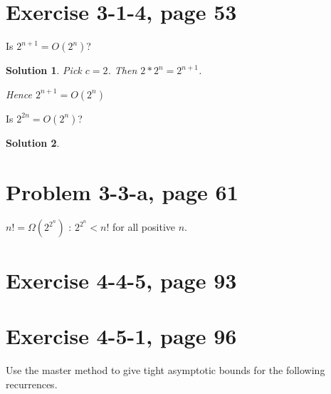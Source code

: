 \documentclass[letterpaper, 11pt]{article}
\theoremstyle{mystyle}
\newtheorem*{sln}{Solution}
\begin{document}
\section{Exercise 3-1-4, page 53}
Is $2^{n+1} = O(2^n)$? 

\begin{sln}
    Pick $c=2$. Then $2 * 2^n = 2^{n+1}$. 

    Hence $2^{n+1} = O(2^n)$
\end{sln}

Is $2^{2n} = O(2^n)$?

\begin{sln}

\end{sln}


\section{Problem 3-3-a, page 61}

\begin{compactitem} 
    \item $n! = \Omega(2^{2^n})$ : $2^{2^n} < n!$ for all positive $n$. 

\end{compactitem}


\section{Exercise 4-4-5, page 93}


\section{Exercise 4-5-1, page 96}
Use the master method to give tight asymptotic bounds for the following recurrences.
\end{document}
